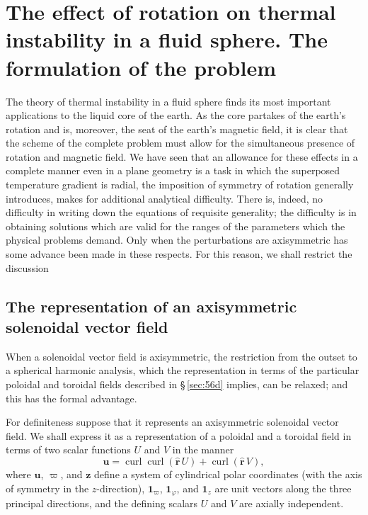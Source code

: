 \section{The effect of rotation on thermal instability in a fluid sphere. The formulation of the problem}\label{sec:61}
The theory of thermal instability in a fluid sphere finds its most
important applications to the liquid core of the earth. As the core
partakes of the earth's rotation and is, moreover, the seat of the earth's
magnetic field, it is clear that the scheme of the complete problem must
allow for the simultaneous presence of rotation and magnetic field. We
have seen that an allowance for these effects in a complete manner even
in a plane geometry is a task in which the superposed temperature
gradient is radial, the imposition of symmetry of rotation generally
introduces, makes for additional analytical difficulty. There
is, indeed, no difficulty in writing down the equations of requisite
generality; the difficulty is in obtaining solutions which are valid for
the ranges of the parameters which the physical problems demand.
Only when the perturbations are axisymmetric has some advance been
made in these respects. For this reason, we shall restrict the discussion

\subsection{The representation of an axisymmetric solenoidal vector field}\label{sec:61a}
When a solenoidal vector field is axisymmetric, the restriction from
the outset to a spherical harmonic analysis, which the representation in
terms of the particular poloidal and toroidal fields described in \S\,\ref{sec:56d}
implies, can be relaxed; and this has the formal advantage.

For definiteness suppose that it represents an axisymmetric solenoidal
vector field. We shall express it as a representation of a poloidal and a
toroidal field in terms of two scalar functions $U$ and $V$ in the manner
\begin{equation}\label{eq:6-201}
\boldsymbol{u} = \operatorname{curl}\operatorname{curl}(\hat{\boldsymbol{r}}\,U) + \operatorname{curl}(\hat{\boldsymbol{r}}\,V),
\end{equation}
where $\boldsymbol{u}$, $\varpi$, and $\boldsymbol{z}$ define a system of cylindrical polar coordinates (with
the axis of symmetry in the $z$-direction), $\mathbf{1}_\varpi$, $\mathbf{1}_\varphi$, and $\mathbf{1}_z$ are unit vectors
along the three principal directions, and the defining scalars $U$ and $V$
are axially independent.

